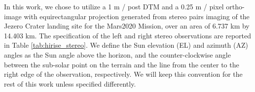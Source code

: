 In this work, we chose to utilize a 1 m / post DTM and a 0.25 m / pixel ortho-image with equirectangular projection generated from stereo pairs imaging of the Jezero Crater landing site for the Mars2020 Mission, over an area of 6.737 km by 14.403 km. The specification of the left and right stereo observations are reported in Table \ref{tab:hirise_stereo}.
We define the Sun elevation (EL) and azimuth (AZ) angles as the Sun angle above the horizon, and the counter-clockwise angle between the sub-solar point on the terrain and the line from the center to the right edge of the observation, respectively. We will keep this convention for the rest of this work unless specified differently.


